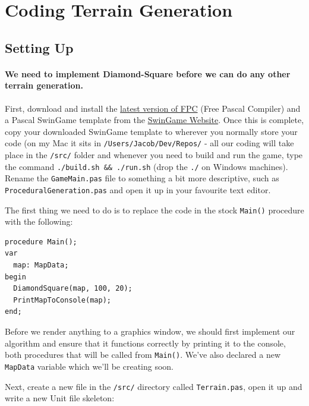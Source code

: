 \documentclass{article}
\begin{document}
\section{Coding Terrain Generation}

\subsection{Setting Up}

\paragraph{We need to implement Diamond-Square before we can do any other terrain generation.}\mbox{}
First, download and install the \href{http://www.freepascal.org/download.var}{latest version of FPC} (Free Pascal Compiler) and a Pascal SwinGame template from the \href{http://swingame.com/index.php/downloads.html}{SwinGame Website}. Once this is complete, copy your downloaded SwinGame template to wherever you normally store your code (on my Mac it sits in \texttt{/Users/Jacob/Dev/Repos/} - all our coding will take place in the \texttt{/src/} folder and whenever you need to build and run the game, type the command \texttt{./build.sh && ./run.sh} (drop the \texttt{./} on Windows machines). Rename the \texttt{GameMain.pas} file to something a bit more descriptive, such as \texttt{ProceduralGeneration.pas} and open it up in your favourite text editor.

The first thing we need to do is to replace the code in the stock \texttt{Main()} procedure with the following:

\begin{verbatim}
procedure Main();
var
  map: MapData;
begin
  DiamondSquare(map, 100, 20);
  PrintMapToConsole(map);
end;
\end{verbatim}

Before we render anything to a graphics window, we should first implement our algorithm and ensure that it functions correctly by printing it to the console, both procedures that will be called from \texttt{Main()}. We've also declared a new \texttt{MapData} variable which we'll be creating soon.

\vspace{1mm}

Next, create a new file in the \texttt{/src/} directory called \texttt{Terrain.pas}, open it up and write a new Unit file skeleton:
\end{document}
